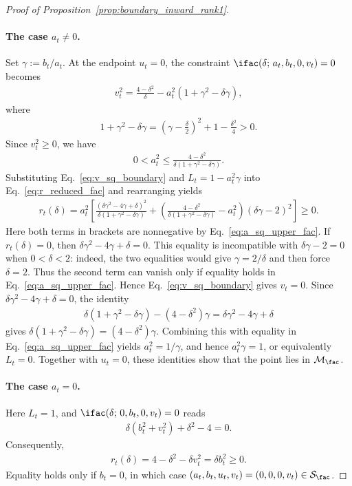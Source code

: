 \documentclass{article}
\begin{document}
\begin{proof}[Proof of Proposition~\ref{prop:boundary_inward_rank1}]
\paragraph{The case $a_t\ne0$.}
Set $\gamma:=b_t/a_t$. At the endpoint $u_t=0$, the
constraint $\ifac(\delta;\,a_t,b_t,0,v_t)=0$ becomes
\begin{align}
    v_t^2
    =\frac{4-\delta^2}{\delta}
     -a_t^2(1+\gamma^2-\delta\gamma),
    \label{eq:v_sq_boundary}
\end{align}
where
\begin{align}
    1+\gamma^2-\delta\gamma
    =\left(\gamma-\frac{\delta}{2}\right)^2
     +1-\frac{\delta^2}{4}
    >0.
\end{align}
Since $v_t^2\ge0$, we have
\begin{align}
    0<a_t^2\le
    \frac{4-\delta^2}
         {\delta(1+\gamma^2-\delta\gamma)}.
    \label{eq:a_sq_upper_fac}
\end{align}
Substituting Eq.~\eqref{eq:v_sq_boundary} and $L_t=1-a_t^2\gamma$ into
Eq.~\eqref{eq:r_reduced_fac} and rearranging yields
\begin{align}
    r_t(\delta)
    =a_t^2\left[
        \frac{(\delta\gamma^2-4\gamma+\delta)^2}
             {\delta(1+\gamma^2-\delta\gamma)}
        +\left(
            \frac{4-\delta^2}
                 {\delta(1+\gamma^2-\delta\gamma)}-a_t^2
         \right)(\delta\gamma-2)^2
      \right]
    \ge0.
    \label{eq:r_fac_square_form}
\end{align}
Here both terms in brackets are nonnegative by
Eq.~\eqref{eq:a_sq_upper_fac}. If $r_t(\delta)=0$, then
$\delta\gamma^2-4\gamma+\delta=0$. This equality is incompatible with
$\delta\gamma-2=0$ when $0<\delta<2$: indeed, the two equalities would give
$\gamma=2/\delta$ and then force $\delta=2$. Thus the second term can vanish
only if equality holds in Eq.~\eqref{eq:a_sq_upper_fac}. Hence
Eq.~\eqref{eq:v_sq_boundary} gives $v_t=0$. Since
$\delta\gamma^2-4\gamma+\delta=0$, the identity
\begin{align}
    \delta(1+\gamma^2-\delta\gamma)
    -(4-\delta^2)\gamma
    =\delta\gamma^2-4\gamma+\delta
\end{align}
gives $\delta(1+\gamma^2-\delta\gamma)=(4-\delta^2)\gamma$. Combining this with
equality in Eq.~\eqref{eq:a_sq_upper_fac} yields $a_t^2=1/\gamma$, and hence
$a_t^2\gamma=1$, or equivalently $L_t=0$.
Together with $u_t=0$, these identities show that the point lies in
$\mathcal M_\fac$.

\paragraph{The case $a_t=0$.}
Here $L_t=1$, and $\ifac(\delta;\,0,b_t,0,v_t)=0$ reads
\begin{align}
    \delta(b_t^2+v_t^2)+\delta^2-4=0.
\end{align}
Consequently,
\begin{align}
    r_t(\delta)
    =4-\delta^2-\delta v_t^2
    =\delta b_t^2\ge0.
\end{align}
Equality holds only if $b_t=0$, in which case
$(a_t,b_t,u_t,v_t)=(0,0,0,v_t)\in\mathcal S_\fac$.


\end{proof}
\end{document}
